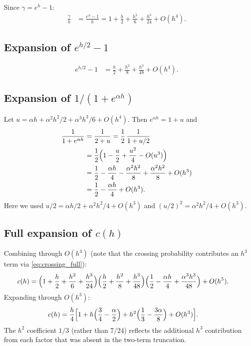 \documentclass[11pt]{article}
\theoremstyle{definition}
\theoremstyle{remark}
\begin{document}
Since $\gamma = e^h - 1$:
\begin{align}
\frac{\gamma}{h} &= \frac{e^h - 1}{h}
= 1 + \frac{h}{2} + \frac{h^2}{6} + \frac{h^3}{24} + O(h^4).
\label{eq:gamma_h_full}
\end{align}

\subsection{Expansion of $e^{h/2} - 1$}

\begin{align}
e^{h/2} - 1 &= \frac{h}{2} + \frac{h^2}{8} + \frac{h^3}{48}
+ O(h^4). \label{eq:exp_half_full}
\end{align}

\subsection{Expansion of $1/(1 + e^{\alpha h})$}

Let $u = \alpha h + \alpha^2 h^2/2 + \alpha^3 h^3/6 + O(h^4)$.
Then $e^{\alpha h} = 1 + u$ and
\begin{align}
\frac{1}{1 + e^{\alpha h}} &= \frac{1}{2 + u}
= \frac{1}{2}\,\frac{1}{1 + u/2} \notag \\
&= \frac{1}{2}\Bigl(1 - \frac{u}{2} + \frac{u^2}{4}
- O(u^3)\Bigr) \notag \\
&= \frac{1}{2} - \frac{\alpha h}{4}
- \frac{\alpha^2 h^2}{8} + \frac{\alpha^2 h^2}{8}
+ O(h^3) \notag \\
&= \frac{1}{2} - \frac{\alpha h}{4}
+ O(h^3).
\label{eq:crossing_full}
\end{align}
Here we used $u/2 = \alpha h/2 + \alpha^2 h^2/4 + O(h^3)$ and
$(u/2)^2 = \alpha^2 h^2/4 + O(h^3)$.

\subsection{Full expansion of $c(h)$}

Combining through $O(h^3)$ (note that the crossing probability
contributes an $h^3$ term via \eqref{eq:crossing_full}):
\begin{align}
c(h) &= \Bigl(1 + \frac{h}{2} + \frac{h^2}{6} + \frac{h^3}{24}\Bigr)
\Bigl(\frac{h}{2} + \frac{h^2}{8} + \frac{h^3}{48}\Bigr)
\Bigl(\frac{1}{2} - \frac{\alpha h}{4}
+ \frac{\alpha^3 h^3}{48}\Bigr) + O(h^5).
\label{eq:c_full}
\end{align}
Expanding through $O(h^3)$:
\begin{align}
c(h) &= \frac{h}{4}\Bigl[1 + h\Bigl(\frac{3}{4}
- \frac{\alpha}{2}\Bigr)
+ h^2\Bigl(\frac{1}{3} - \frac{3\alpha}{8}\Bigr)
+ O(h^3)\Bigr].
\label{eq:c_full_simplified}
\end{align}
The $h^2$ coefficient $1/3$ (rather than $7/24$) reflects the
additional $h^3$ contribution from each factor that was absent in the
two-term truncation.
\end{document}
